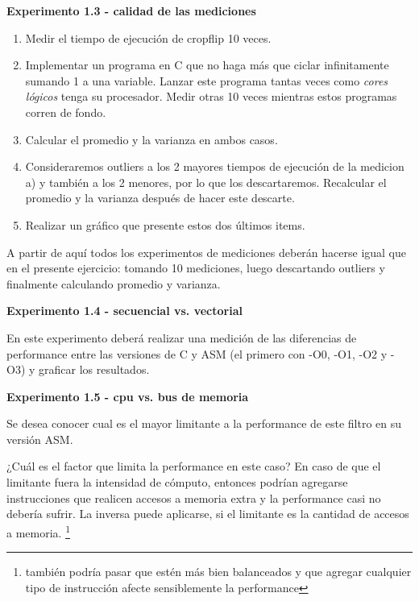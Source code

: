 \newpage
\vspace*{0.3cm} \noindent
\textbf{Experimento 1.3 - calidad de las mediciones}

\begin{enumerate}
    \item Medir el tiempo de ejecución de cropflip 10 veces. 
    \item Implementar un programa en C que no haga más que ciclar 
            infinitamente sumando 1 a una variable. 
            Lanzar este programa tantas veces como \emph{cores lógicos} tenga 
            su procesador. 
            Medir otras 10 veces mientras estos programas corren de fondo.
    \item Calcular el promedio y la varianza en ambos casos.
    \item Consideraremos outliers a los 2 mayores tiempos
     de ejecución de la medicion a) y también a los 2 menores,
     por lo que los descartaremos. Recalcular el promedio y la varianza después de hacer este descarte.
    \item Realizar un gráfico que presente estos dos últimos items.
\end{enumerate}

A partir de aquí todos los experimentos de mediciones deberán hacerse igual 
que en el presente ejercicio: tomando 10 mediciones, luego descartando 
outliers y finalmente calculando promedio y varianza.

\noindent\textbf{Experimento 1.4 - secuencial vs. vectorial}

En este experimento deberá realizar una medición de las diferencias de 
performance entre las versiones de C y ASM (el primero con -O0, -O1, -O2 y -O3) 
y graficar los resultados.

\vspace*{0.3cm} \noindent
\textbf{Experimento 1.5 - cpu vs. bus de memoria}

Se desea conocer cual es el mayor limitante a la
performance de este filtro en su versión ASM.

¿Cuál es el factor que limita la performance en este caso?
En caso de que el limitante fuera la intensidad de cómputo, entonces 
podrían agregarse instrucciones que realicen accesos a memoria extra y la
performance casi no debería sufrir. 
La inversa puede aplicarse, si el limitante es la cantidad de accesos a memoria.
\footnote{también podría pasar que estén más bien balanceados y que agregar
cualquier tipo de instrucción afecte sensiblemente la performance}
	
